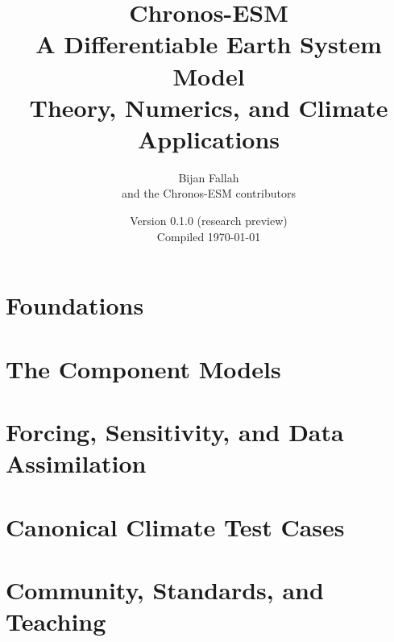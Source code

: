 \documentclass[11pt,openany]{book}
\title{\bfseries Chronos-ESM\\[0.3em]\large A Differentiable Earth System Model\\[0.6em]
       \normalsize Theory, Numerics, and Climate Applications}
\author{Bijan Fallah \\ \small and the Chronos-ESM contributors}
\date{Version 0.1.0 (research preview) \\ \small Compiled \today}
\begin{document}
\frontmatter

\tableofcontents
\listoffigures

\mainmatter

\part{Foundations}




\part{The Component Models}











\part{Forcing, Sensitivity, and Data Assimilation}



\part{Canonical Climate Test Cases}





\part{Community, Standards, and Teaching}



\appendix






\backmatter


\end{document}
